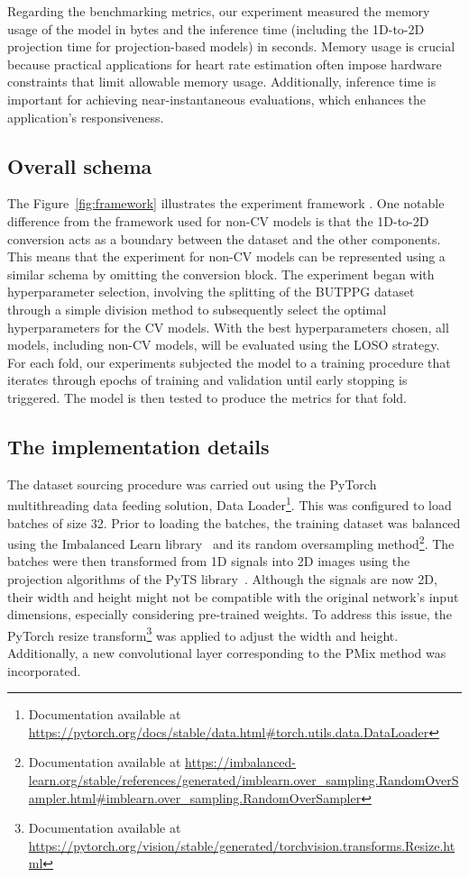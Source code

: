 Regarding the benchmarking metrics, our experiment measured the memory usage of the model in bytes and the inference time (including the 1D-to-2D projection time for projection-based models) in seconds. Memory usage is crucial because practical applications for heart rate estimation often impose hardware constraints that limit allowable memory usage. Additionally, inference time is important for achieving near-instantaneous evaluations, which enhances the application's responsiveness.

\subsection{Overall schema}



The Figure~\ref{fig:framework} illustrates the experiment framework . One notable difference from the framework used for non-\gls{CV} models is that the 1D-to-2D conversion acts as a boundary between the dataset and the other components. This means that the experiment for non-\gls{CV} models can be represented using a similar schema by omitting the conversion block. The experiment began with hyperparameter selection, involving the splitting of the \gls{BUTPPG} dataset through a simple division method to subsequently select the optimal hyperparameters for the \gls{CV} models. With the best hyperparameters chosen, all models, including non-\gls{CV} models, will be evaluated using the \gls{LOSO} strategy. For each fold, our experiments subjected the model to a training procedure that iterates through epochs of training and validation until early stopping is triggered. The model is then tested to produce the metrics for that fold.
\subsection{The implementation details}

The dataset sourcing procedure was carried out using the PyTorch multithreading data feeding solution, Data Loader\footnote{Documentation available at \url{https://pytorch.org/docs/stable/data.html\#torch.utils.data.DataLoader}}. This was configured to load batches of size 32. Prior to loading the batches, the training dataset was balanced using the Imbalanced Learn library~\cite{ImbalancedLearn} and its random oversampling method\footnote{Documentation available at \url{https://imbalanced-learn.org/stable/references/generated/imblearn.over_sampling.RandomOverSampler.html\#imblearn.over_sampling.RandomOverSampler}}. The batches were then transformed from 1D signals into 2D images using the projection algorithms of the PyTS library~\cite{PyTS}. Although the signals are now 2D, their width and height might not be compatible with the original network's input dimensions, especially considering pre-trained weights. To address this issue, the PyTorch resize transform\footnote{Documentation available at \url{https://pytorch.org/vision/stable/generated/torchvision.transforms.Resize.html}} was applied to adjust the width and height. Additionally, a new convolutional layer corresponding to the \gls{PMix} method was incorporated.

